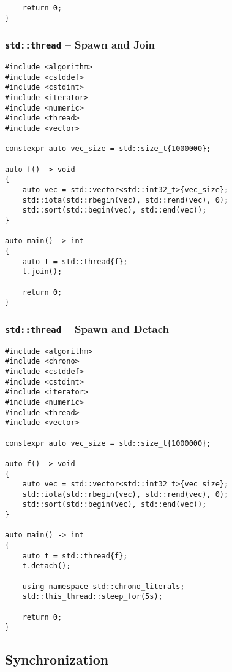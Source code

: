 \begin{appendix}
\begin{verbatim}
    return 0;
}
\end{verbatim}

\subsubsection{\texttt{std::thread} -- Spawn and Join}\label{app:conc_thread_join}

\begin{verbatim}
#include <algorithm>
#include <cstddef>
#include <cstdint>
#include <iterator>
#include <numeric>
#include <thread>
#include <vector>

constexpr auto vec_size = std::size_t{1000000};

auto f() -> void
{
    auto vec = std::vector<std::int32_t>{vec_size};
    std::iota(std::rbegin(vec), std::rend(vec), 0);
    std::sort(std::begin(vec), std::end(vec));
}

auto main() -> int
{
    auto t = std::thread{f};
    t.join();
    
    return 0;
}
\end{verbatim}

\subsubsection{\texttt{std::thread} -- Spawn and Detach}\label{app:conc_thread_detach}

\begin{verbatim}
#include <algorithm>
#include <chrono>
#include <cstddef>
#include <cstdint>
#include <iterator>
#include <numeric>
#include <thread>
#include <vector>

constexpr auto vec_size = std::size_t{1000000};

auto f() -> void
{
    auto vec = std::vector<std::int32_t>{vec_size};
    std::iota(std::rbegin(vec), std::rend(vec), 0);
    std::sort(std::begin(vec), std::end(vec));
}

auto main() -> int
{
    auto t = std::thread{f};
    t.detach();
    
    using namespace std::chrono_literals;
    std::this_thread::sleep_for(5s);
    
    return 0;
}
\end{verbatim}

\subsection{Synchronization}\label{app:scorep_sync}


\end{appendix}
